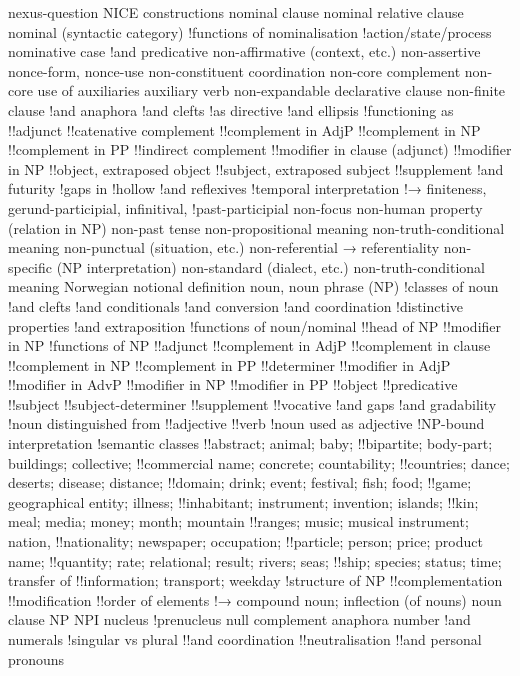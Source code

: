 nexus-question
NICE constructions
nominal clause
nominal relative clause
nominal (syntactic category)
!functions of
nominalisation
!action/state/process
nominative case
!and predicative
non-affirmative (context, etc.)
non-assertive
nonce-form, nonce-use
non-constituent coordination
non-core complement
non-core use of auxiliaries auxiliary verb
non-expandable declarative clause
non-finite clause
!and anaphora
!and clefts
!as directive
!and ellipsis
!functioning as
!!adjunct
!!catenative complement
!!complement in AdjP
!!complement in NP
!!complement in PP
!!indirect complement
!!modifier in clause (adjunct)
!!modifier in NP
!!object, extraposed object
!!subject, extraposed subject
!!supplement
!and futurity
!gaps in
!hollow
!and reflexives
!temporal interpretation
!→ finiteness, gerund-participial, infinitival,
!past-participial
non-focus
non-human property (relation in NP)
non-past tense
non-propositional meaning
non-truth-conditional meaning
non-punctual (situation, etc.)
non-referential → referentiality
non-specific (NP interpretation)
non-standard (dialect, etc.)
non-truth-conditional meaning
Norwegian
notional definition
noun, noun phrase (NP)
!classes of noun
!and clefts
!and conditionals
!and conversion
!and coordination
!distinctive properties
!and extraposition
!functions of noun/nominal
!!head of NP
!!modifier in NP
!functions of NP
!!adjunct
!!complement in AdjP
!!complement in clause
!!complement in NP
!!complement in PP
!!determiner
!!modifier in AdjP
!!modifier in AdvP
!!modifier in NP
!!modifier in PP
!!object
!!predicative
!!subject
!!subject-determiner
!!supplement
!!vocative
!and gaps
!and gradability
!noun distinguished from
!!adjective
!!verb
!noun used as adjective
!NP-bound interpretation
!semantic classes
!!abstract; animal; baby;
!!bipartite; body-part; buildings; collective;
!!commercial name; concrete; countability;
!!countries; dance; deserts; disease; distance;
!!domain; drink; event; festival; fish; food;
!!game; geographical entity; illness;
!!inhabitant; instrument; invention; islands;
!!kin; meal; media; money; month; mountain
!!ranges; music; musical instrument; nation,
!!nationality; newspaper; occupation;
!!particle; person; price; product name;
!!quantity; rate; relational; result; rivers; seas;
!!ship; species; status; time; transfer of
!!information; transport; weekday
!structure of NP
!!complementation
!!modification
!!order of elements
!→ compound noun; inflection (of nouns)
noun clause
NP
NPI
nucleus
!prenucleus
null complement anaphora
number
!and numerals
!singular vs plural
!!and coordination
!!neutralisation
!!and personal pronouns
